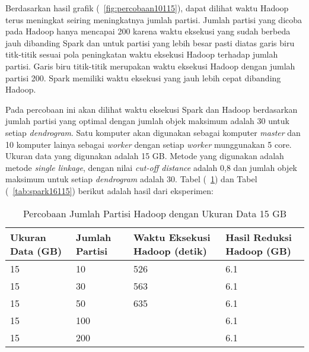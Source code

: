 Berdasarkan hasil grafik (~\ref{fig:percobaan10115}), dapat dilihat waktu Hadoop terus meningkat seiring meningkatnya jumlah partisi. Jumlah partisi yang dicoba pada Hadoop hanya mencapai 200 karena waktu eksekusi yang sudah berbeda jauh dibanding Spark dan untuk partisi yang lebih besar pasti diatas garis biru titk-titik sesuai pola peningkatan waktu eksekusi Hadoop terhadap jumlah partisi. Garis biru titik-titik merupakan waktu eksekusi Hadoop dengan jumlah partisi 200. Spark memiliki waktu eksekusi yang jauh lebih cepat dibanding Hadoop.  





Pada percobaan ini akan dilihat waktu eksekusi Spark dan Hadoop berdasarkan jumlah partisi yang optimal dengan jumlah objek maksimum adalah 30 untuk setiap \textit{dendrogram}. Satu komputer akan digunakan sebagai komputer \textit{master} dan 10 komputer lainya sebagai \textit{worker} dengan setiap \textit{worker} munggunakan 5 core. Ukuran data yang digunakan adalah 15 GB. Metode yang digunakan adalah metode \textit{single linkage}, dengan nilai \textit{cut-off distance} adalah 0,8 dan jumlah objek maksimum untuk setiap \textit{dendrogram} adalah 30. Tabel (~\ref{tab:spark15115}) dan Tabel (~\ref{tab:spark16115}) berikut adalah hasil dari eksperimen:





\begin{table}[H] 
	\centering 
	\caption{Percobaan Jumlah Partisi Hadoop dengan Ukuran Data 15 GB}
	\label{tab:spark15115}
	\begin{tabular}{|p{3cm}|p{3cm}|p{4cm}|p{4cm}|}
\hline
Ukuran Data (GB) & Jumlah Partisi &  Waktu Eksekusi Hadoop (detik) & Hasil Reduksi Hadoop (GB)\\
\hline
15 & 10 & 526  & 6.1  \\
\hline
15 & 30 & 563  & 6.1  \\
\hline
15 & 50 & 635  & 6.1  \\
\hline
15 & 100 &   & 6.1  \\
\hline
15 & 200 &   & 6.1  \\
\hline


\hline

	\end{tabular} 
\end{table}




